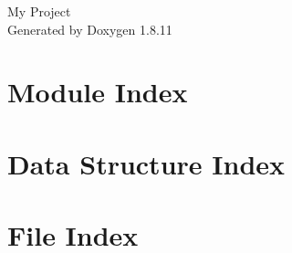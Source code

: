 \documentclass[twoside]{book}
\newcommand{\+}{\discretionary{\mbox{\scriptsize$\hookleftarrow$}}{}{}}
\newcommand{\clearemptydoublepage}{%
  \newpage{\pagestyle{empty}\cleardoublepage}%
}
\begin{document}
\hypersetup{pageanchor=false,
             bookmarksnumbered=true,
             pdfencoding=unicode
            }
\begin{titlepage}
\vspace*{7cm}
\begin{center}%
{\Large My Project }\\
\vspace*{1cm}
{\large Generated by Doxygen 1.8.11}\\
\end{center}
\end{titlepage}
\clearemptydoublepage
\tableofcontents
\clearemptydoublepage
{}
\hypersetup{pageanchor=true}

\chapter{Module Index}

\chapter{Data Structure Index}

\chapter{File Index}

\end{document}
